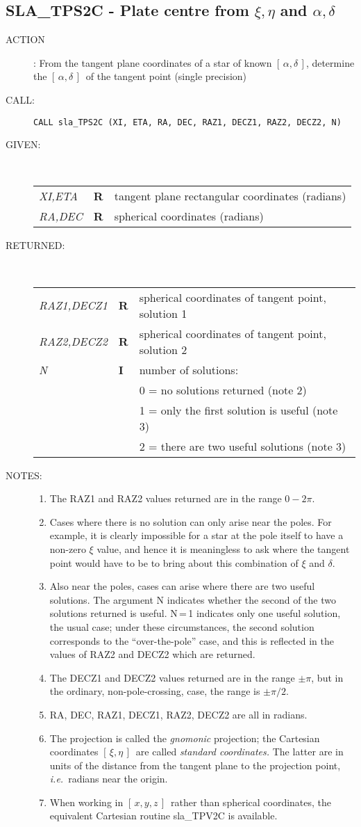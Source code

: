 \documentclass[11pt,twoside]{article}
\newcommand{\xlabel}[1]{}
\newcommand{\radec}     {$[\,\alpha,\delta\,]$}
\newcommand{\xieta}     {$[\,\xi,\eta\,]$}
\newcommand{\xyz}       {$[\,x,y,z\,]$}
\newcommand{\routine}[3]
{\hbadness=10000
  \vbox
  {
    \rule{\textwidth}{0.3mm}\\
    {\Large {\bf #1} \hfill #2 \hfill {\bf #1}}\\
    \setlength{\oldspacing}{\topsep}
    \setlength{\topsep}{0.3ex}
    \begin{description}
      #3
    \end{description}
    \setlength{\topsep}{\oldspacing}
  }
}
\renewcommand{\routine}[3]
   {
      \subsection{#1\xlabel{#1} - #2\label{#1}}
       \begin{description}
         #3
       \end{description}
   }
\newcommand{\action}[1]
{\item[ACTION]: #1}
\newcommand{\action}[1]
   {\item[ACTION:] #1}
\newcommand{\call}[1]
{\item[CALL]: \hspace{0.4em}{\tt #1}}
\newlength{\oldspacing}
\renewcommand{\call}[1]
   {
    \item[CALL:] {\tt #1}
   }
\newcommand{\args}[2]
{
  \goodbreak
  \setlength{\oldspacing}{\topsep}
  \setlength{\topsep}{0.3ex}
  \begin{description}
  \item[#1]:\\[1.5ex]
    \begin{tabular}{p{7em}p{6em}p{22em}}
      #2
    \end{tabular}
  \end{description}
  \setlength{\topsep}{\oldspacing}
}
\renewcommand{\args}[2]
   {
     \begin{description}
        \item[#1:]\\
        \begin{tabular}{p{7em}p{6em}l}
           #2
        \end{tabular}
     \end{description}
   }
\newcommand{\spec}[3]
{
  {\em {#1}} & {\bf \mbox{#2}} & {#3}
}
\newcommand{\notes}[1]
{
  \goodbreak
  \setlength{\oldspacing}{\topsep}
  \setlength{\topsep}{0.3ex}
  \begin{description}
    \item[NOTES]:
        #1
  \end{description}
  \setlength{\topsep}{\oldspacing}
}
\renewcommand{\notes}[1]
   {
      \begin{description}
         \item[NOTES:]
            #1
      \end{description}
   }
\begin{document}
\routine{SLA\_TPS2C}{Plate centre from $\xi,\eta$ and $\alpha,\delta$}
{
 \action{From the tangent plane coordinates of a star of known \radec,
        determine the \radec\ of the tangent point (single precision)}
 \call{CALL sla\_TPS2C (XI, ETA, RA, DEC, RAZ1, DECZ1, RAZ2, DECZ2, N)}
}
\args{GIVEN}
{
 \spec{XI,ETA}{R}{tangent plane rectangular coordinates (radians)} \\
 \spec{RA,DEC}{R}{spherical coordinates (radians)}
}
\args{RETURNED}
{
 \spec{RAZ1,DECZ1}{R}{spherical coordinates of tangent point,
                      solution 1} \\
 \spec{RAZ2,DECZ2}{R}{spherical coordinates of tangent point,
                      solution 2} \\
 \spec{N}{I}{number of solutions:} \\
 \spec{}{}{\hspace{1em} 0 = no solutions returned  (note 2)} \\
 \spec{}{}{\hspace{1em} 1 = only the first solution is useful (note 3)} \\
 \spec{}{}{\hspace{1em} 2 = there are two useful solutions (note 3)}
}
\notes
{
 \begin{enumerate}
  \item The RAZ1 and RAZ2 values returned are in the range $0\!-\!2\pi$.
  \item Cases where there is no solution can only arise near the poles.
        For example, it is clearly impossible for a star at the pole
        itself to have a non-zero $\xi$ value, and hence it is
        meaningless to ask where the tangent point would have to be
        to bring about this combination of $\xi$ and $\delta$.
  \item Also near the poles, cases can arise where there are two useful
        solutions.  The argument N indicates whether the second of the
        two solutions returned is useful.  N\,=\,1
        indicates only one useful solution, the usual case;  under
        these circumstances, the second solution corresponds to the
        ``over-the-pole'' case, and this is reflected in the values
        of RAZ2 and DECZ2 which are returned.
  \item The DECZ1 and DECZ2 values returned are in the range $\pm\pi$,
        but in the ordinary, non-pole-crossing, case, the range is
        $\pm\pi/2$.
  \item RA, DEC, RAZ1, DECZ1, RAZ2, DECZ2 are all in radians.
  \item The projection is called the {\it gnomonic}\/ projection;  the
        Cartesian coordinates \xieta\ are called
        {\it standard coordinates.}\/  The latter
        are in units of the distance from the tangent plane to the projection
        point, {\it i.e.}\ radians near the origin.
  \item When working in \xyz\ rather than spherical coordinates, the
        equivalent Cartesian routine sla\_TPV2C is available.
 \end{enumerate}
}
\end{document}
